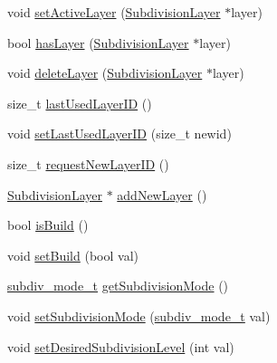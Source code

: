 \begin{DoxyCompactItemize}
\item 
void \hyperlink{classShipCADGeometry_1_1SubdivisionSurface_a69bafa71111e562a52a089be99b47871}{set\-Active\-Layer} (\hyperlink{classShipCADGeometry_1_1SubdivisionLayer}{Subdivision\-Layer} $\ast$layer)
\item 
bool \hyperlink{classShipCADGeometry_1_1SubdivisionSurface_aef9fe9a74054b54292f7f64e0589743c}{has\-Layer} (\hyperlink{classShipCADGeometry_1_1SubdivisionLayer}{Subdivision\-Layer} $\ast$layer)
\item 
void \hyperlink{classShipCADGeometry_1_1SubdivisionSurface_a3f0dac49106056562a8b675c61918abe}{delete\-Layer} (\hyperlink{classShipCADGeometry_1_1SubdivisionLayer}{Subdivision\-Layer} $\ast$layer)
\item 
size\-\_\-t \hyperlink{classShipCADGeometry_1_1SubdivisionSurface_adc6b4fcef1874f8153d9297be3cee19e}{last\-Used\-Layer\-I\-D} ()
\item 
void \hyperlink{classShipCADGeometry_1_1SubdivisionSurface_a9a84fd8dab00f34bf6f4a1e6663e52a3}{set\-Last\-Used\-Layer\-I\-D} (size\-\_\-t newid)
\item 
size\-\_\-t \hyperlink{classShipCADGeometry_1_1SubdivisionSurface_a3af3a30b53d867b2b25f9ac9290a264a}{request\-New\-Layer\-I\-D} ()
\item 
\hyperlink{classShipCADGeometry_1_1SubdivisionLayer}{Subdivision\-Layer} $\ast$ \hyperlink{classShipCADGeometry_1_1SubdivisionSurface_a5bf8f452664e17dae636d4b66a66eba9}{add\-New\-Layer} ()
\item 
bool \hyperlink{classShipCADGeometry_1_1SubdivisionSurface_a4e7ac46da75513b4764ee35580a4e59f}{is\-Build} ()
\item 
void \hyperlink{classShipCADGeometry_1_1SubdivisionSurface_aec5073750762d1f8c3ab2107a742f4a5}{set\-Build} (bool val)
\item 
\hyperlink{classShipCADGeometry_1_1SubdivisionSurface_a0006dff46f8a47b8b37746602c6c2eca}{subdiv\-\_\-mode\-\_\-t} \hyperlink{classShipCADGeometry_1_1SubdivisionSurface_aa088371fc23ba3bd68f705c64a051734}{get\-Subdivision\-Mode} ()
\item 
void \hyperlink{classShipCADGeometry_1_1SubdivisionSurface_a048dce00d2ff87aa5b31319ea41f565a}{set\-Subdivision\-Mode} (\hyperlink{classShipCADGeometry_1_1SubdivisionSurface_a0006dff46f8a47b8b37746602c6c2eca}{subdiv\-\_\-mode\-\_\-t} val)
\item 
void \hyperlink{classShipCADGeometry_1_1SubdivisionSurface_a53271216c1be89154c08d2b2841f9a60}{set\-Desired\-Subdivision\-Level} (int val)
\item 

\end{DoxyCompactItemize}
